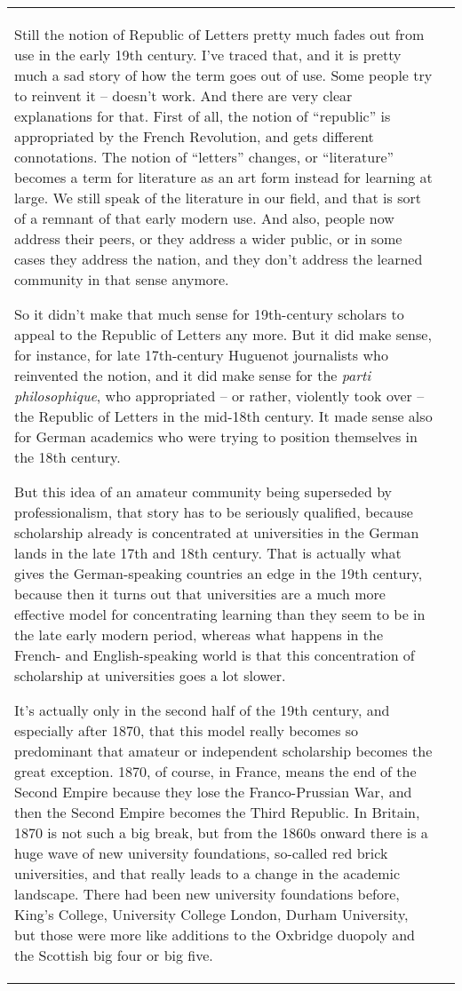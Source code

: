\documentclass[12pt]{article}
\begin{document}
\begin{flushleft}
\begin{supertabular}{m{0.24415985in}m{5.89766in}}
Still the notion of Republic of Letters pretty much fades out from use in the early 19th century. I’ve traced that, and it is pretty much a sad story of how the term goes out of use. Some people try to reinvent it – doesn’t work. And there are very clear explanations for that. First of all, the notion of “republic” is appropriated by the French Revolution, and gets different connotations. The notion of “letters” changes, or “literature” becomes a term for literature as an art form instead for learning at large. We still speak of the literature in our field, and that is sort of a remnant of that early modern use. And also, people now address their peers, or they address a wider public, or in some cases they address the nation, and they don’t address the learned community in that sense anymore. 

So it didn’t make that much sense for 19th-century scholars to appeal to the Republic of Letters any more. But it did make sense, for instance, for late 17th-century Huguenot journalists who reinvented the notion, and it did make sense for the \textit{parti philosophique}, who appropriated – or rather, violently took over – the Republic of Letters in the mid-18th century. It made sense also for German academics who were trying to position themselves in the 18th century. 

But this idea of an amateur community being superseded by professionalism, that story has to be seriously qualified, because scholarship already is concentrated at universities in the German lands in the late 17th and 18th century. That is actually what gives the German-speaking countries an edge in the 19th century, because then it turns out that universities are a much more effective model for concentrating learning than they seem to be in the late early modern period, whereas what happens in the French- and English-speaking world is that this concentration of scholarship at universities goes a lot slower. 

It’s actually only in the second half of the 19th century, and especially after 1870, that this model really becomes so predominant that amateur or independent scholarship becomes the great exception. 1870, of course, in France, means the end of the Second Empire because they lose the Franco-Prussian War, and then the Second Empire becomes the Third Republic. In Britain, 1870 is not such a big break, but from the 1860s onward there is a huge wave of new university foundations, so-called red brick universities, and that really leads to a change in the academic landscape. There had been new university foundations before, King’s College, University College London, Durham University, but those were more like additions to the Oxbridge duopoly and the Scottish big four or big five. 


\end{supertabular}
\end{flushleft}
\end{document}
